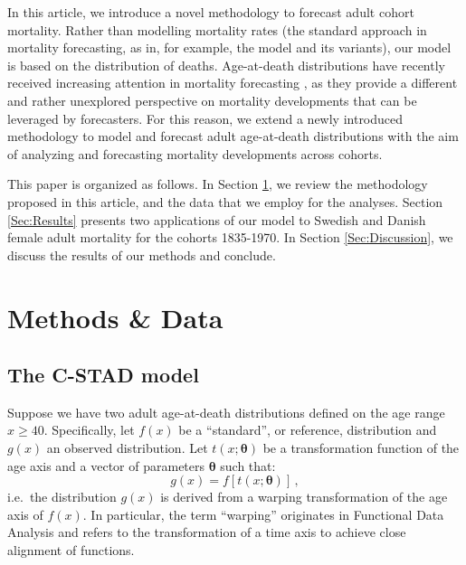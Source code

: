 \documentclass[11pt, a4paper]{article}
\begin{document}
In this article, we introduce a novel methodology to forecast adult cohort mortality. Rather than modelling mortality rates (the standard approach in mortality forecasting, as in, for example, the \citeauthor{lee1992modeling} model and its variants), our model is based on the distribution of deaths. Age-at-death distributions have recently received increasing attention in mortality forecasting \citep{oeppen2008coherent,bergeron2017coherent,basellini2019modelling,pascariu2019maximum}, as they provide a different and rather unexplored perspective on mortality developments that can be leveraged by forecasters. For this reason, we extend a newly introduced methodology to model and forecast adult age-at-death distributions \citep{basellini2019modelling} with the aim of analyzing and forecasting mortality developments across cohorts. \par 
 
This paper is organized as follows. In Section \ref{Sec:Methods}, we review the methodology proposed in this article, and the data that we employ for the analyses. Section \ref{Sec:Results} presents two applications of our model to Swedish and Danish female adult mortality for the cohorts 1835-1970. In Section \ref{Sec:Discussion}, we discuss the results of our methods and conclude. 

\section{Methods \& Data}
\label{Sec:Methods}
\subsection{The C-STAD model}
\label{Subsec:C-STADmodel}
Suppose we have two adult age-at-death distributions defined on the age range $x \geq 40$. Specifically, let $f(x)$ be a ``standard'', or reference, distribution and $g(x)$ an observed distribution. Let $t(x;\bm{\theta})$ be a transformation function of the age axis and a vector of parameters $\bm{\theta}$ such that:
%
\begin{equation}\label{Eq:gxftx}
g(x) = f\left[t(x;\bm{\theta})\right]\,, 
\end{equation}  
%
i.e.~the distribution $g(x)$ is derived from a warping transformation of the age axis of $f(x)$. In particular, the term ``warping'' originates in Functional Data Analysis \citep{ramsay2005FDA} and refers to the transformation of a time axis to achieve close alignment of functions. \par
\end{document}
